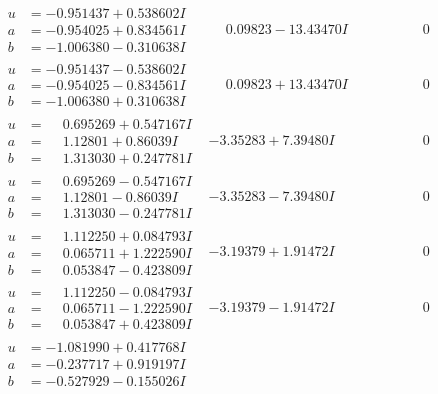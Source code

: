 \documentclass[1p]{elsarticle_modified}
\theoremstyle{definition}
\begin{document}
$$\begin{array}{c|c|c}
\begin{aligned}
u &= -0.951437 + 0.538602 I \\
a &= -0.954025 + 0.834561 I \\
b &= -1.006380 - 0.310638 I\end{aligned}
 & \phantom{-}0.09823 - 13.43470 I & \phantom{-0.000000 } 0 \\ \hline\begin{aligned}
u &= -0.951437 - 0.538602 I \\
a &= -0.954025 - 0.834561 I \\
b &= -1.006380 + 0.310638 I\end{aligned}
 & \phantom{-}0.09823 + 13.43470 I & \phantom{-0.000000 } 0 \\ \hline\begin{aligned}
u &= \phantom{-}0.695269 + 0.547167 I \\
a &= \phantom{-}1.12801 + 0.86039 I \\
b &= \phantom{-}1.313030 + 0.247781 I\end{aligned}
 & -3.35283 + 7.39480 I & \phantom{-0.000000 } 0 \\ \hline\begin{aligned}
u &= \phantom{-}0.695269 - 0.547167 I \\
a &= \phantom{-}1.12801 - 0.86039 I \\
b &= \phantom{-}1.313030 - 0.247781 I\end{aligned}
 & -3.35283 - 7.39480 I & \phantom{-0.000000 } 0 \\ \hline\begin{aligned}
u &= \phantom{-}1.112250 + 0.084793 I \\
a &= \phantom{-}0.065711 + 1.222590 I \\
b &= \phantom{-}0.053847 - 0.423809 I\end{aligned}
 & -3.19379 + 1.91472 I & \phantom{-0.000000 } 0 \\ \hline\begin{aligned}
u &= \phantom{-}1.112250 - 0.084793 I \\
a &= \phantom{-}0.065711 - 1.222590 I \\
b &= \phantom{-}0.053847 + 0.423809 I\end{aligned}
 & -3.19379 - 1.91472 I & \phantom{-0.000000 } 0 \\ \hline\begin{aligned}
u &= -1.081990 + 0.417768 I \\
a &= -0.237717 + 0.919197 I \\
b &= -0.527929 - 0.155026 I\end{aligned}

\end{array}$$
\end{document}
